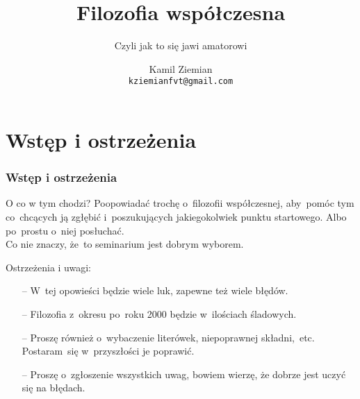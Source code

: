 \documentclass{beamer}  %
\title[Filozofia współczesna]{Filozofia współczesna}
\subtitle{Czyli jak to się jawi amatorowi}
\author{Kamil Ziemian \\
  \texttt{kziemianfvt@gmail.com}}
\institute{Uniwersytet Jagielloński w~Krakowie, \\
  Wydział Fizyki, Astronomii i~Informatyki Stosowanej}
\begin{document}



\begin{frame}
  \titlepage
\end{frame}



\section[]{Wstęp i ostrzeżenia}



\begin{frame}
  \frametitle{Wstęp i ostrzeżenia}

  \begin{block}{O co w tym chodzi?}
    Poopowiadać trochę o~filozofii współczesnej, aby~pomóc tym
    co~chcących ją zgłębić i~poszukujących jakiegokolwiek punktu
    startowego. Albo po~prostu o~niej posłuchać. \\
    Co nie znaczy, że~to seminarium jest dobrym wyborem.
  \end{block}

  \begin{block}{Ostrzeżenia i uwagi:}
    \begin{itemize}
    \item[--] W~tej opowieści będzie wiele luk, zapewne też wiele
      błędów.
    \item[--] Filozofia z~okresu po~roku 2000 będzie w~ilościach
      śladowych.
    \item[--] Proszę również o~wybaczenie literówek, niepoprawnej
      składni,~etc. Postaram~się w~przyszłości je poprawić.
    \item[--] Proszę o~zgłoszenie wszystkich uwag, bowiem wierzę, że
      dobrze jest uczyć się na błędach.
    \end{itemize}
  \end{block}

\end{frame}
\end{document}
